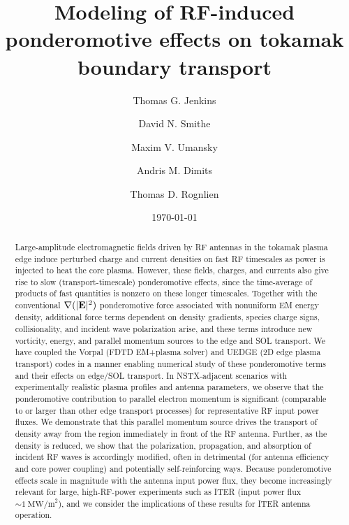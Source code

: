 




\title[Modeling of RF-induced ponderomotive effects on tokamak boundary transport]
      {Modeling of RF-induced ponderomotive effects on tokamak boundary transport} 
\author{Thomas G. Jenkins}
\author{David N. Smithe}
\author{Maxim V. Umansky}
\author{Andris M. Dimits}
\author{Thomas D. Rognlien}
 
\date{\today}

\begin{abstract}
Large-amplitude electromagnetic fields driven by RF antennas in the tokamak plasma edge induce perturbed 
charge and current densities on fast RF timescales as power is injected to heat the core plasma. However, 
these fields, charges, and currents also give rise to slow (transport-timescale) ponderomotive effects, since 
the time-average of products of fast quantities is nonzero on these longer timescales. Together with the 
conventional $\nabla(|{\bf E}|^{2})$ ponderomotive force associated with nonuniform EM energy density, 
additional force terms dependent on density gradients, species charge signs, collisionality, and incident 
wave polarization arise, and these terms introduce new vorticity, energy, and parallel momentum sources 
to the edge and SOL transport.  We have coupled the Vorpal (FDTD EM+plasma solver) and UEDGE (2D 
edge plasma transport) codes in a manner enabling numerical study of these ponderomotive terms and 
their effects on edge/SOL transport. In NSTX-adjacent scenarios with experimentally realistic plasma 
profiles and antenna parameters, we observe that the ponderomotive contribution to parallel electron 
momentum is significant (comparable to or larger than other edge transport processes) for representative 
RF input power fluxes. We demonstrate that this parallel momentum source drives the transport of density 
away from the region immediately in front of the RF antenna. Further, as the density is reduced, we show 
that the polarization, propagation, and absorption of incident RF waves is accordingly modified, often in 
detrimental (for antenna efficiency and core power coupling) and potentially self-reinforcing ways.  
Because ponderomotive effects scale in magnitude with the antenna input power flux, they become 
increasingly relevant for large, high-RF-power experiments such as ITER (input power flux 
$\sim 1~\mbox{MW/m}^2$), and we consider the implications of these results for ITER antenna operation.
\end{abstract}

